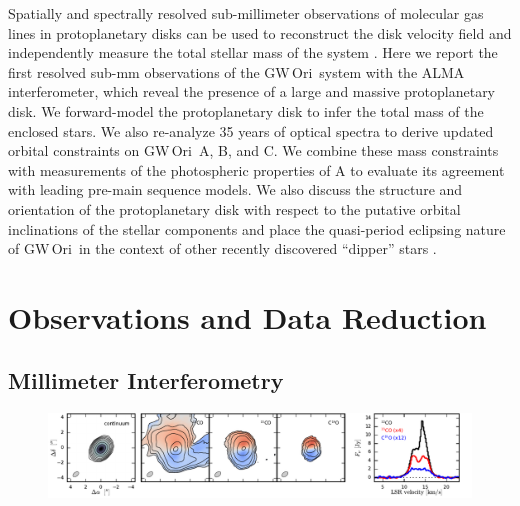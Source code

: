 \documentclass[twocolumn]{aastex61}
\newcommand{\todo}[1]{ \textcolor{red}{#1}}
\newcommand{\gw}{GW\,Ori}
\begin{document}

Spatially and spectrally resolved sub-millimeter observations of molecular gas lines in protoplanetary disks can be used to reconstruct the disk velocity field and independently measure the total stellar mass of the system \citep[e.g.,][]{rosenfeld12b,czekala15a,czekala16}. Here we report the first resolved sub-mm observations of the \gw\ system with the ALMA interferometer, which reveal the presence of a large and massive protoplanetary disk. We forward-model the protoplanetary disk to infer the total mass of the enclosed stars. We also re-analyze 35 years of optical spectra to derive updated orbital constraints on \gw\ A, B, and C. We combine these mass constraints with measurements of the photospheric properties of A to evaluate its agreement with leading pre-main sequence models. We also discuss the structure and orientation of the protoplanetary disk with respect to the putative orbital inclinations of the stellar components and place the quasi-period eclipsing nature of \gw\ in the context of other recently discovered ``dipper'' stars \citep[e.g.,][]{ansdell16b,ansdell16a}.

\section{Observations and Data Reduction \label{sec:obs}}


\subsection{Millimeter Interferometry}

\begin{figure}[ht!]
\begin{center}
  \includegraphics[width=\linewidth]{moments.pdf}
  \end{center}
\end{figure}
\end{document}
